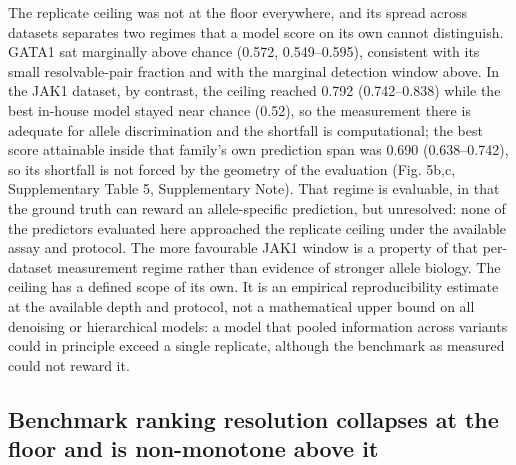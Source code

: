 \documentclass[11pt,letterpaper]{article}
\begin{document}
The replicate ceiling was not at the floor everywhere, and its spread across datasets separates two regimes that a model score on its own cannot distinguish. GATA1 sat marginally above chance (0.572, 0.549--0.595), consistent with its small resolvable-pair fraction and with the marginal detection window above. In the JAK1 dataset, by contrast, the ceiling reached 0.792 (0.742--0.838) while the best in-house model stayed near chance (0.52), so the measurement there is adequate for allele discrimination and the shortfall is computational; the best score attainable inside that family's own prediction span was 0.690 (0.638--0.742), so its shortfall is not forced by the geometry of the evaluation (Fig. 5b,c, Supplementary Table 5, Supplementary Note). That regime is evaluable, in that the ground truth can reward an allele-specific prediction, but unresolved: none of the predictors evaluated here approached the replicate ceiling under the available assay and protocol. The more favourable JAK1 window is a property of that per-dataset measurement regime rather than evidence of stronger allele biology. The ceiling has a defined scope of its own. It is an empirical reproducibility estimate at the available depth and protocol, not a mathematical upper bound on all denoising or hierarchical models: a model that pooled information across variants could in principle exceed a single replicate, although the benchmark as measured could not reward it.


\subsection*{Benchmark ranking resolution collapses at the floor and is non-monotone above it}
\end{document}
